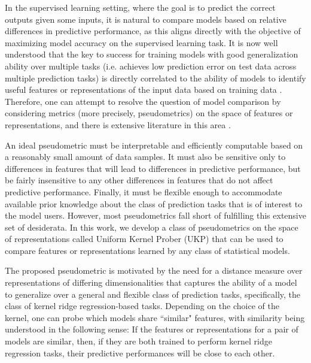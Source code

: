 \documentclass[11pt]{article}
\theoremstyle{plain}
\begin{document}
In the supervised learning setting, where the goal is to predict the correct outputs given some inputs, it is natural to compare models based on relative differences in predictive performance, as this aligns directly with the objective of maximizing model accuracy on the supervised learning task. It is now well understood that the key to success for training models with good generalization ability over multiple tasks (i.e. achieves low prediction error on test data across multiple prediction tasks) is directly correlated to the ability of models to identify useful features or representations of the input data based on training data \cite{bengio2013representation,lecun2015deep,maurer2016benefit}. Therefore, one can attempt to resolve the question of model comparison by considering metrics (more precisely, pseudometrics) on the space of features or representations, and there is extensive literature in this area \cite{laakso2000content,li2015convergent,morcos2018insights,wang2018towards,kornblith2019similarity,GULP}.

  An ideal pseudometric must be interpretable and efficiently computable based on a reasonably small amount of data samples. It must also be sensitive only to differences in features that will lead to differences in predictive performance, but be fairly insensitive to any other differences in features that do not affect predictive performance. Finally, it must be flexible enough to accommodate available prior knowledge about the class of prediction tasks that is of interest to the model users. However, most pseudometrics fall short of fulfilling this extensive set of desiderata. In this work, we develop a class of pseudometrics on the space of representations called Uniform Kernel Prober (UKP) that can be used to compare features or representations learned by any class of statistical models. 

 The proposed pseudometric is motivated by the need for a distance measure over representations of differing 
 dimensionalities that captures the ability of a model to generalize over a general and flexible class of prediction tasks, specifically, the class of kernel ridge regression-based tasks. Depending on the choice of the kernel, one can probe which models share ``similar" features, with similarity being understood in the following sense: If the features or representations for a pair of models are similar, then, if they are both trained to perform kernel ridge regression tasks, their predictive performances will be close to each other.
 
\end{document}
